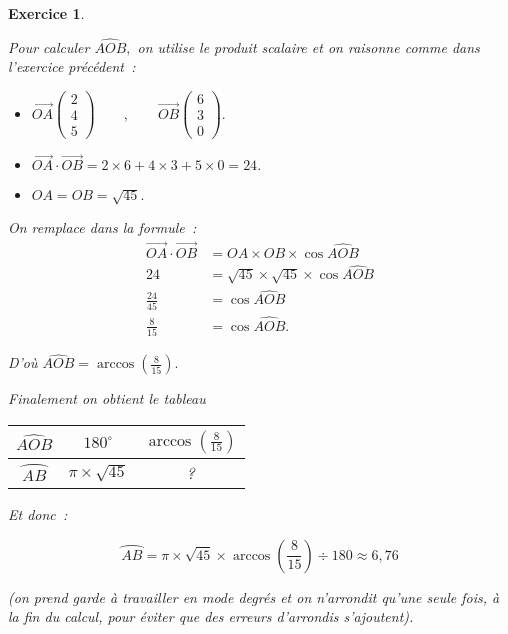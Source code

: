\documentclass[10pt]{article}
\newtheorem{exo}{Exercice}
\begin{document}
\begin{exo}
\begin{enumerate}
\begin{multicols}{2}

Pour calculer $\widehat{AOB},$ on utilise le produit scalaire et on raisonne comme dans l'exercice précédent~:

\medskip
\begin{itemize}
\item[\textbullet] $\overrightarrow{OA}\begin{pmatrix} 2\\4\\5\end{pmatrix}\qquad ,\qquad \overrightarrow{OB}\begin{pmatrix} 6\\3\\0\end{pmatrix}.$
\medskip
\item[\textbullet] $\overrightarrow{OA}\cdot\overrightarrow{OB}=2\times 6+4\times 3+5\times 0=24.$
\medskip
\item[\textbullet] $OA=OB=\sqrt{45}.$

\end{itemize}

\medskip

On remplace dans la formule~:
\begin{align*}
\overrightarrow{OA}\cdot\overrightarrow{OB}&=OA\times OB\times \cos\widehat{AOB}\\
24&=\sqrt{45}\times\sqrt{45}\times \cos\widehat{AOB}\\
\frac{24}{45}&=\cos\widehat{AOB}\\
\frac{8}{15}&=\cos\widehat{AOB}.
\end{align*}

D'où $\widehat{AOB}=\arccos\left(\frac{8}{15}\right).$

\medskip

Finalement on obtient le tableau 

\medskip

\begin{center}

\begin{tabular}{|c|c|c|}\hline
$\widehat{AOB}$&$180^{\circ}$&$\arccos\left(\frac{8}{15}\right)$\\ \hline
$\wideparen{AB}$&$\pi\times \sqrt{45}$&~?~\\ \hline
\end{tabular}

\end{center}

\medskip

Et donc~:
 
\[\wideparen{AB}=\pi\times \sqrt{45}\times \arccos\left(\frac{8}{15}\right)\div 180\approx 6,76\]

(on prend garde à travailler en mode degrés et on n'arrondit qu'une seule fois, à la fin du calcul, pour éviter que des erreurs d'arrondis s'ajoutent).

\end{multicols}


\end{enumerate}


\end{exo}
\end{document}
